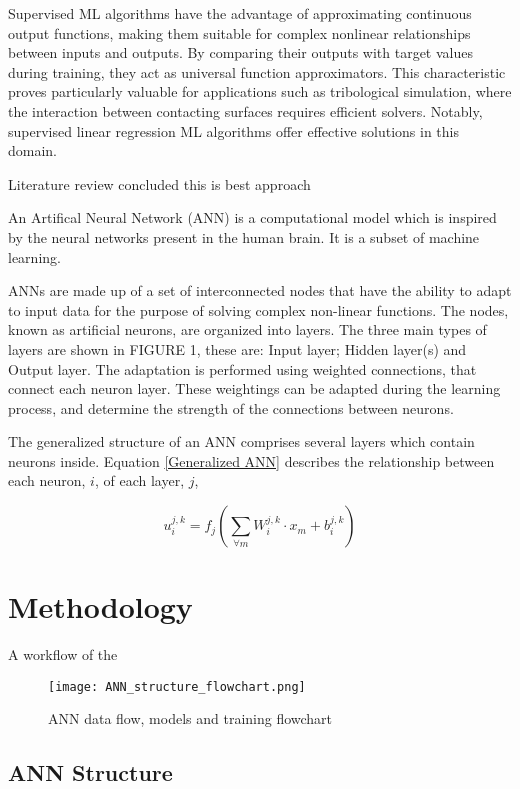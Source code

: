 Supervised ML algorithms have the advantage of approximating continuous output functions, making them suitable for complex nonlinear relationships between inputs and outputs. By comparing their outputs with target values during training, they act as universal function approximators. This characteristic proves particularly valuable for applications such as tribological simulation, where the interaction between contacting surfaces requires efficient solvers. Notably, supervised linear regression ML algorithms offer effective solutions in this domain.

Literature review concluded this is best approach

An Artifical Neural Network (ANN) is a computational model which is inspired by the neural networks present in the human brain. It is a subset of machine learning.

ANNs are made up of a set of interconnected nodes that have the ability to adapt to input data for the purpose of solving complex non-linear functions. The nodes, known as artificial neurons, are organized into layers. The three main types of layers are shown in FIGURE 1, these are: Input layer; Hidden layer(s) and Output layer. The adaptation is performed using weighted connections, that connect each neuron layer. These weightings can be adapted during the learning process, and determine the strength of the connections between neurons.

The generalized structure of an ANN comprises several layers which contain neurons inside. Equation \ref{Generalized ANN} describes the relationship between each neuron, $i$, of each layer, $j$,

\begin{equation}\label{Generalized ANN}
	u_i^{j, k}=f_j\left(\sum_{\forall m} W_i^{j, k} \cdot x_m+b_i^{j, k}\right)
\end{equation}


\section{Methodology}

A workflow of the 

\begin{figure}  
	\centering
	\texttt{[image: ANN\_structure\_flowchart.png]}
	\caption{ANN data flow, models and training flowchart}
	\label{ANN flowchart}
\end{figure} 



\subsection{ANN Structure}


